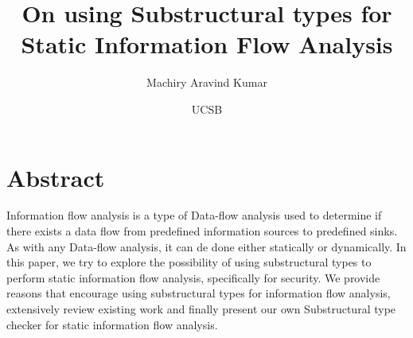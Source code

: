 \documentclass[11pt, pdftex]{article}
\title{On using Substructural types for Static Information Flow Analysis}
\author{Machiry Aravind Kumar}
\date{UCSB}
\begin{document}
\maketitle
\section{Abstract}
Information flow analysis is a type of Data-flow analysis\cite{Wiki01} used to determine if there exists a data flow from predefined information sources to predefined sinks. As with any Data-flow analysis, it can de done either statically or dynamically. In this paper, we try to explore the possibility of using substructural types to perform static information flow analysis, specifically for security. We provide reasons that encourage using substructural types for information flow analysis, extensively review existing work and finally present our own Substructural type checker for static information flow analysis. 
\end{document}
